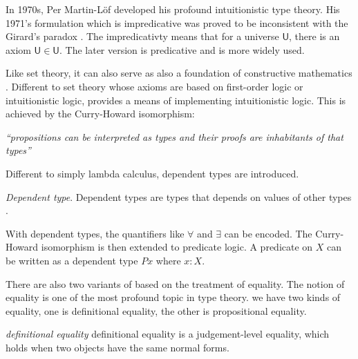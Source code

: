 In 1970s, Per Martin-L\"{o}f \cite{per:71,per:82}  developed his profound intuitionistic type theory. His 1971's formulation which is impredicative was proved to be inconsistent with the Girard's paradox \cite{hurkens1995simplification}. The impredicativty means that for a universe $\mathsf{U}$, there is an axiom $\mathsf{U} \in \mathsf{U}$. The later version is predicative and is more widely used.

Like set theory, it can also serve as also a foundation of constructive mathematics \cite{martin1984intuitionistic}. Different to set theory whose axioms are based on first-order logic or intuitionistic logic, \mltt provides a means of implementing intuitionistic logic. This is achieved by the Curry-Howard
isomorphism:

\emph{``propositions can be interpreted as types and their
  proofs are inhabitants of that types''} 


Different to simply lambda calculus, dependent types are introduced.

\begin{definition}\label{dpty}
\textit{Dependent type}. Dependent types are types that depends on values of other types \cite{dtw}. 
\end{definition}

With dependent types, the quantifiers like $\forall$ and $\exists$ can be encoded.
The Curry-Howard isomorphism is then extended to predicate logic. 
A predicate on $X$ can be written as a dependent type $P x$ where $x : X$. 

There are also two variants of \mltt based on the treatment of equality.
The notion of equality is one of the most profound topic in type theory.
we have two kinds of equality, one is definitional equality, the other is propositional equality.

\begin{definition}
\textit{definitional equality} definitional equality is a judgement-level equality, which holds when two objects have the same normal forms\cite{nor:90}.
\end{definition}



